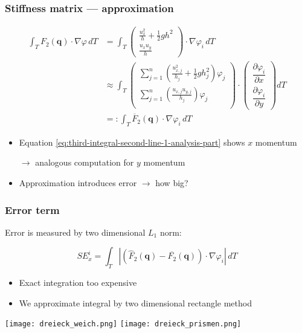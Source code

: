\documentclass{beamer}
\newcommand{\pd}[2]{\dfrac{\partial #1}{\partial #2}}
\renewcommand{\phi}{\varphi}
\begin{document}
\begin{frame}
  \frametitle{Stiffness matrix --- approximation}
  \begin{align}
    \label{eq:third-integral-second-line-1-analysis-part}
    \int_T F_2(\mathbf{q}) \cdot \nabla \phi \, dT & =
    \int_T
    \begin{pmatrix}
      \frac{u_x^2}{h} + \frac{1}{2} g h^2 \\ \frac{u_x u_y}{h}
    \end{pmatrix}
    \cdot \nabla \phi_i \, dT \\
    \label{eq:third-integral-second-line-2-analysis-part}
    & \approx
    \int_T
    \begin{pmatrix}
      \sum_{j=1}^n \left(\frac{u_{x,j}^2}{h_j} + \frac{1}{2} g h_j^2\right) \phi_j \\
      \sum_{j=1}^n \left(\frac{u_{x,j} u_{y,j}}{h_j}\right) \phi_j \\
    \end{pmatrix}
    \cdot
    \begin{pmatrix}
      \pd{\phi_i}{x} \\
      \pd{\phi_i}{y}
    \end{pmatrix} dT \\
    & =: \int_T \overline{F}_2(\mathbf{q}) \cdot \nabla \phi_i \,dT
  \end{align}
  \begin{itemize}
  \item Equation \eqref{eq:third-integral-second-line-1-analysis-part} shows $x$ momentum

    $\rightarrow$ analogous computation for $y$ momentum
  \item Approximation introduces error $\rightarrow$ how big?
  \end{itemize}
\end{frame}

\begin{frame}
  \frametitle{Error term}
  Error is measured by two dimensional $L_1$ norm:

  \begin{equation}
    \label{eq:SE-definition}
    SE_x^i = \int_T \left| \left( \widehat F_2 (\mathbf{q}) - \overline{F_2}(\mathbf{q}) \right) \cdot \nabla \phi_i \right| \,dT
  \end{equation}

  \begin{itemize}
  \item Exact integration too expensive
  \item We approximate integral by two dimensional rectangle method
  \end{itemize}
  \begin{center}
    \texttt{[image: dreieck\_weich.png]}
    \texttt{[image: dreieck\_prismen.png]}
  \end{center}
\end{frame}
\end{document}
